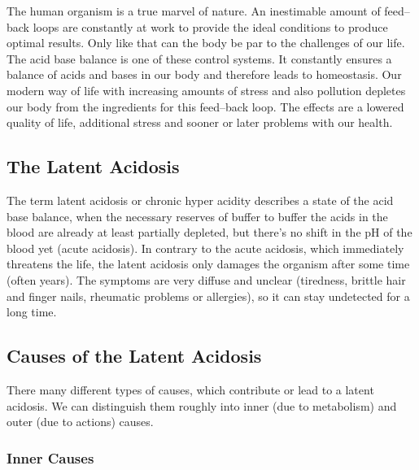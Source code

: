 \documentclass[../main.tex]{subfiles}
\begin{document}
The human organism is a true marvel of nature.
An inestimable amount of feed--back loops are constantly at work to provide the ideal conditions to  produce optimal results.
Only like that can the body be par to the challenges of our life.
The acid base balance is one of these control systems.
It constantly ensures a balance of acids and bases in our body and therefore leads to homeostasis.
Our modern way of life with increasing amounts of stress and also pollution depletes our body from the ingredients for this feed--back loop.
The effects are a lowered quality of life, additional stress and sooner or later problems with our health.

\subsection{The Latent Acidosis}

The term latent acidosis or chronic hyper acidity describes a state
of the acid base balance, when the necessary reserves of buffer to buffer the acids in the blood are already at least partially depleted,
but there's no shift in the pH of the blood yet (acute acidosis).
In contrary to the acute acidosis, which immediately threatens the life,
the latent acidosis only damages the organism after some time (often years).
The symptoms are very diffuse and unclear (tiredness, brittle hair and finger nails, rheumatic problems or allergies),
so it can stay undetected for a long time.

\subsection{Causes of the Latent Acidosis}

There many different types of causes, which contribute or lead to a latent acidosis.
We can distinguish them roughly into inner (due to metabolism) and outer (due to actions) causes.

\subsubsection{Inner Causes}
\end{document}
